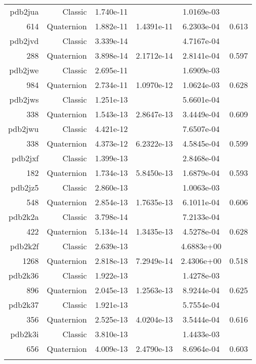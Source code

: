\begin{xltabular}{\textwidth}{r|rS[table-format=1.3e+2]S[table-format=1.4e+2]S[table-format=1.4e+2]S[table-format=-1.3]}
pdb2jua & Classic & 1.740e-11 &  & 1.0169e-03 & \\
614 & Quaternion & 1.882e-11 & 1.4391e-11 & 6.2303e-04 & 0.613\\  \addlinespace
pdb2jvd & Classic & 3.339e-14 &  & 4.7167e-04 & \\
288 & Quaternion & 3.898e-14 & 2.1712e-14 & 2.8141e-04 & 0.597\\  \addlinespace
pdb2jwe & Classic & 2.695e-11 &  & 1.6909e-03 & \\
984 & Quaternion & 2.734e-11 & 1.0970e-12 & 1.0624e-03 & 0.628\\  \addlinespace
pdb2jws & Classic & 1.251e-13 &  & 5.6601e-04 & \\
338 & Quaternion & 1.543e-13 & 2.8647e-13 & 3.4449e-04 & 0.609\\  \addlinespace
pdb2jwu & Classic & 4.421e-12 &  & 7.6507e-04 & \\
338 & Quaternion & 4.373e-12 & 6.2322e-13 & 4.5845e-04 & 0.599\\  \addlinespace
pdb2jxf & Classic & 1.399e-13 &  & 2.8468e-04 & \\
182 & Quaternion & 1.734e-13 & 5.8450e-13 & 1.6879e-04 & 0.593\\  \addlinespace
pdb2jz5 & Classic & 2.860e-13 &  & 1.0063e-03 & \\
548 & Quaternion & 2.854e-13 & 1.7635e-13 & 6.1011e-04 & 0.606\\  \addlinespace
pdb2k2a & Classic & 3.798e-14 &  & 7.2133e-04 & \\
422 & Quaternion & 5.134e-14 & 1.3435e-13 & 4.5278e-04 & 0.628\\  \addlinespace
{\color{red} pdb2k2f } & Classic & 2.639e-13 &  & 4.6883e+00 & \\
1268 & Quaternion & 2.818e-13 & 7.2949e-14 & 2.4306e+00 & 0.518\\  \addlinespace
pdb2k36 & Classic & 1.922e-13 &  & 1.4278e-03 & \\
896 & Quaternion & 2.045e-13 & 1.2563e-13 & 8.9244e-04 & 0.625\\  \addlinespace
pdb2k37 & Classic & 1.921e-13 &  & 5.7554e-04 & \\
356 & Quaternion & 2.525e-13 & 4.0204e-13 & 3.5444e-04 & 0.616\\  \addlinespace
pdb2k3i & Classic & 3.810e-13 &  & 1.4433e-03 & \\
656 & Quaternion & 4.009e-13 & 2.4790e-13 & 8.6964e-04 & 0.603\\  \addlinespace

\end{xltabular}
